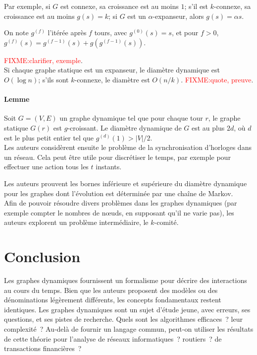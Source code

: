 \documentclass[12pt,a4paper]{article}
\begin{document}
Par exemple, si \(G\) est connexe, sa croissance est au moins \(1\);
s'il est \(k\)-connexe, sa croissance est au moins \(g(s) = k\); si
\(G\) est un \(\alpha\)-expanseur, alors \(g(s) = \alpha s\).

On note \(g^{(f)}\) l'itérée après \(f\) tours, avec
\(g^{(0)}(s) = s\), et pour \(f > 0\),
\(g^{(f)}(s) = g^{(f-1)}(s) + g(g^{(f-1)}(s))\).

\textcolor{red}{FIXME:\@ clarifier, exemple}.\\

Si chaque graphe statique est un expanseur, le diamètre dynamique est
\(O(\log n)\); s'ils sont \(k\)-connexe, le diamètre est \(O(n/k)\).
\textcolor{red}{FIXME:\@ quote, preuve}.

\paragraph{Lemme} Soit \(G = (V, E)\) un graphe dynamique tel que pour
chaque tour \(r\), le graphe statique \(G(r)\) est \(g\)-croissant. Le
diamètre dynamique de \(G\) est au plus \(2d\), où \(d\) est le plus
petit entier tel que \(g^{(d)}(1) > |V|/2\).\\

Les auteurs considèrent ensuite le problème de la synchronisation
d'horloges dans un réseau. Cela peut être utile pour discrétiser le
temps, par exemple pour effectuer une action tous les \(t\) instants.

Les auteurs prouvent les bornes inférieure et supérieure du diamètre
dynamique pour les graphes dont l'évolution est déterminée
par une chaîne de Markov.\\

Afin de pouvoir résoudre divers problèmes dans les graphes dynamiques
(par exemple compter le nombres de nœuds, en supposant qu'il ne varie
pas), les auteurs explorent un problème intermédiaire, le
\(k\)-comité.

\section{Conclusion}
Les graphes dynamiques fournissent un formalisme pour décrire des
interactions au cours du temps. Bien que les auteurs proposent des
modèles ou des dénominations légèrement différents, les concepts
fondamentaux restent identiques. Les graphes dynamiques sont un sujet
d'étude jeune, avec erreurs, ses questions, et ses pistes de
recherche. Quels sont les algorithmes efficaces~? leur complexité~?
Au-delà de fournir un langage commun, peut-on utiliser les résultats
de cette théorie pour l'analyse de réseaux informatiques~? routiers~?
de transactions financières~?

\printbibliography{}
\end{document}
